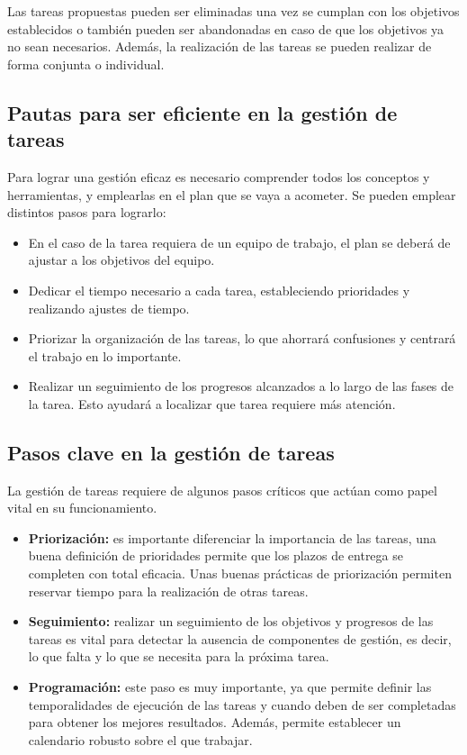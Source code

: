 Las tareas propuestas pueden ser eliminadas una vez se cumplan con los objetivos establecidos o también pueden ser abandonadas en caso de que los objetivos ya no sean necesarios. Además, la realización de las tareas se pueden realizar de forma conjunta o individual.

\subsection{Pautas para ser eficiente en la gestión de tareas}

Para lograr una gestión eficaz es necesario comprender todos los conceptos y herramientas, y emplearlas en el plan que se vaya a acometer. Se pueden emplear distintos pasos para lograrlo:

\begin{itemize}
    \item En el caso de la tarea requiera de un equipo de trabajo, el plan se deberá de ajustar a los objetivos del equipo.
    \item Dedicar el tiempo necesario a cada tarea, estableciendo prioridades y realizando ajustes de tiempo.
    \item Priorizar la organización de las tareas, lo que ahorrará confusiones y centrará el trabajo en lo importante.
    \item Realizar un seguimiento de los progresos alcanzados a lo largo de las fases de la tarea. Esto ayudará a localizar que tarea requiere más atención.
\end{itemize}

\subsection{Pasos clave en la gestión de tareas}

La gestión de tareas requiere de algunos pasos críticos que actúan como papel vital en su funcionamiento.

\begin{itemize}
    \item \textbf{Priorización:} es importante diferenciar la importancia de las tareas, una buena definición de prioridades permite que los plazos de entrega se completen con total eficacia. Unas buenas prácticas de priorización permiten reservar tiempo para la realización de otras tareas.
    \item \textbf{Seguimiento:} realizar un seguimiento de los objetivos y progresos de las tareas es vital para detectar la ausencia de componentes de gestión, es decir, lo que falta y lo que se necesita para la próxima tarea.
    \item \textbf{Programación:} este paso es muy importante, ya que permite definir las temporalidades de ejecución de las tareas y cuando deben de ser completadas para obtener los mejores resultados. Además, permite establecer un calendario robusto sobre el que trabajar.
\end{itemize}


